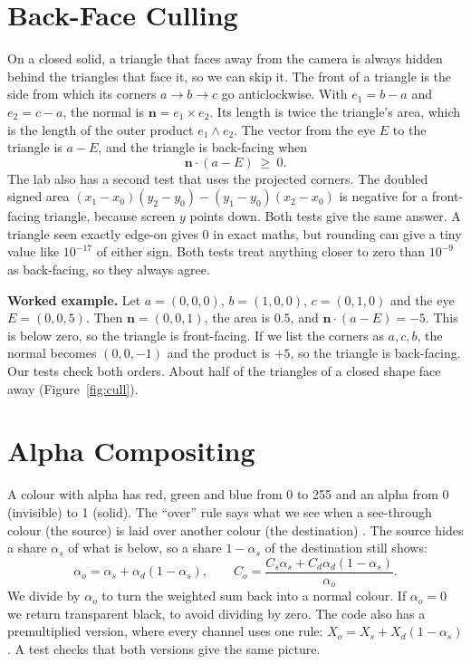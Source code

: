 
\section{Back-Face Culling}\label{sec:cull}
On a closed solid, a triangle that faces away from the camera is always hidden behind the triangles that face it, so we can skip it. The front of a triangle is the side from which its corners $a\to b\to c$ go anticlockwise. With $e_1=b-a$ and $e_2=c-a$, the normal is $\mathbf n=e_1\times e_2$. Its length is twice the triangle's area, which is the length of the outer product $e_1\wedge e_2$. The vector from the eye $E$ to the triangle is $a-E$, and the triangle is back-facing when
\[
\mathbf n\cdot(a-E)\ \ge\ 0 .
\]
The lab also has a second test that uses the projected corners. The doubled signed area $(x_1-x_0)(y_2-y_0)-(y_1-y_0)(x_2-x_0)$ is negative for a front-facing triangle, because screen $y$ points down. Both tests give the same answer. A triangle seen exactly edge-on gives 0 in exact maths, but rounding can give a tiny value like $10^{-17}$ of either sign. Both tests treat anything closer to zero than $10^{-9}$ as back-facing, so they always agree.

\textbf{Worked example.} Let $a=(0,0,0)$, $b=(1,0,0)$, $c=(0,1,0)$ and the eye $E=(0,0,5)$. Then $\mathbf n=(0,0,1)$, the area is $0.5$, and $\mathbf n\cdot(a-E)=-5$. This is below zero, so the triangle is front-facing. If we list the corners as $a,c,b$, the normal becomes $(0,0,-1)$ and the product is $+5$, so the triangle is back-facing. Our tests check both orders. About half of the triangles of a closed shape face away (Figure~\ref{fig:cull}).


\section{Alpha Compositing}
A colour with alpha has red, green and blue from 0 to 255 and an alpha from 0 (invisible) to 1 (solid). The ``over'' rule says what we see when a see-through colour (the source) is laid over another colour (the destination) \cite{porterduff1984}. The source hides a share $\alpha_s$ of what is below, so a share $1-\alpha_s$ of the destination still shows:
\[
\alpha_o=\alpha_s+\alpha_d(1-\alpha_s),\qquad
C_o=\frac{C_s\alpha_s+C_d\alpha_d(1-\alpha_s)}{\alpha_o}.
\]
We divide by $\alpha_o$ to turn the weighted sum back into a normal colour. If $\alpha_o=0$ we return transparent black, to avoid dividing by zero. The code also has a premultiplied version, where every channel uses one rule: $X_o=X_s+X_d(1-\alpha_s)$. A test checks that both versions give the same picture.

